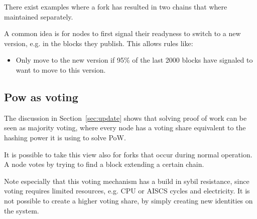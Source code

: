 There exist examples where a fork has resulted in two chains that where maintained separately.

\begin{idea} A common idea is for nodes to first signal their readyness to switch to a new version, e.g. in the blocks they publish.
This allows rules like:
\begin{itemize}
	\item Only move to the new version if 95\% of the last 2000 blocks have signaled to want to move to this version.
\end{itemize}
\end{idea}

\subsection{Pow as voting}
The discussion in Section~\ref{sec:update} shows that solving proof of work can be seen as majority voting, where every node has a voting share equivalent to the hashing power it is using to solve PoW. 

It is possible to take this view also for forks that occur during normal operation. A node votes by trying to find a block extending a certain chain.

Note especially that this voting mechanism has a build in sybil resistance, 
since voting requires limited resources, e.g. CPU or AISCS cycles and electricity. It is not possible to create a higher voting share, by simply creating new identities on the system.

